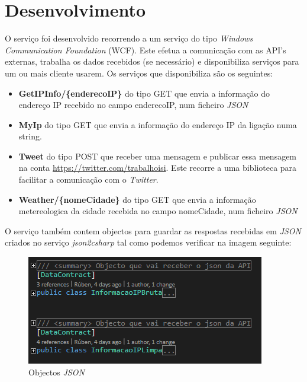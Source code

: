 \documentclass[11pt]{report}
\begin{document}
\chapter*{Desenvolvimento}

O serviço foi desenvolvido recorrendo a um serviço do tipo \textit{Windows Communication Foundation} (WCF). Este efetua a comunicação com as API's externas, trabalha os dados recebidos (se necessário) e disponibiliza serviços para um ou mais cliente usarem. Os serviços que disponibiliza são os seguintes:
\begin{itemize}
\item \textbf{GetIPInfo/\{enderecoIP\}} do tipo GET que envia a informação do endereço IP recebido no campo enderecoIP, num ficheiro \textit{JSON}
\item \textbf{MyIp} do tipo GET que envia a informação do endereço IP da ligação numa string.
\item \textbf{Tweet} do tipo POST que receber uma mensagem e publicar essa mensagem na conta \url{https://twitter.com/trabalhoisi}. Este recorre a uma biblioteca\cite{TinyTwitter} para facilitar a comunicação com o \textit{Twitter}.
\item \textbf{Weather/\{nomeCidade\}} do tipo GET que envia a informação metereologica da cidade recebida  no campo nomeCidade, num ficheiro \textit{JSON}
\end{itemize}

\clearpage

O serviço também contem objectos para guardar as respostas recebidas em \textit{JSON} criados no serviço \textit{json2csharp} tal como podemos verificar na imagem seguinte:

\begin{figure} [!h]
\centering
\includegraphics[width=\textwidth]{Prints_Trabalho/objectos.png}
\caption{Objectos \textit{JSON}}
\label{Rotulo}
\end{figure}
\end{document}
